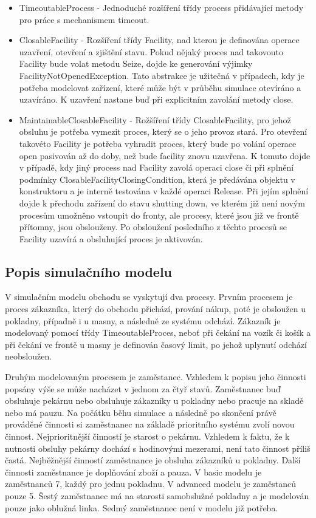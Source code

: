 \documentclass[12pt,a4paper,titlepage]{article}
\begin{document}
\begin{itemize}
\item TimeoutableProcess  - Jednoduché rozšíření třídy process přidávající metody pro práce s mechanismem timeout.
\item ClosableFacility -  Rozšíření třídy Facility, nad kterou je definována operace uzavření, otevření a zjištění stavu. Pokud nějaký proces nad takovouto Facility bude volat metodu Seize, dojde ke generování výjimky FacilityNotOpenedException. Tato abstrakce je užitečná v případech, kdy je potřeba modelovat zařízení, které může být v průběhu simulace otevíráno a uzavíráno. K uzavření nastane buď při explicitním zavolání metody close. 
\item MaintainableClosableFacility - Rožšíření třídy ClosableFacility, pro jehož obsluhu je potřeba vymezit proces, který se o jeho provoz stará. Pro otevření takovéto Facility je potřeba vyhradit proces, který bude po volání operace open pasivován až do doby, než bude facility znovu uzavřena. K tomuto dojde v případě, kdy jiný process nad Facility zavolá operaci close či při splnění podmínky ClosableFacilityClosingCondition, která je předávána objektu v konstruktoru a je interně testována v každé operaci Release. Při jejím splnění dojde k přechodu zařízení do stavu shutting down, ve kterém již není novým procesům umožněno vstoupit do fronty, ale procesy, které jsou již ve frontě přítomny, jsou obslouženy. Po obsloužení posledního z těchto procesů se Facility uzavírá a obsluhující proces je aktivován. 
\end{itemize}

\subsection{Popis simulačního modelu}
V simulačním modelu obchodu se vyskytují dva procesy. Prvním procesem je proces zákazníka, který do obchodu přichází, prování nákup, poté je obsloužen u pokladny, případně i u masny, a následně ze systému odchází. Zákazník je modelovaný pomocí třídy TimeoutableProces, neboť při čekání na vozík či košík a při čekání ve frontě u masny je definován časový limit, po jehož uplynutí odchází neobsloužen.

Druhým modelovaným procesem je zaměstanec. Vzhledem k popisu jeho činnosti popsány výše se může nacházet v jednom za čtyř stavů. Zaměstnanec buď obsluhuje pekárnu nebo obsluhuje zákazníky u pokladny nebo pracuje na skladě nebo má pauzu. Na počátku běhu simulace a následně po skončení právě prováděné činnosti si zaměstnanec na základě prioritního systému zvolí novou činnost. Nejprioritnější činností je starost o pekárnu. Vzhledem k faktu, že k nutnosti obsluhy pekárny dochází s hodinovými mezerami, není tato činnost příliš častá. Nejběžnější činností zaměstnance je obsluha zákazníků u pokladny. Další činnosti zaměstnance je doplňování zboží a pauza. V basic modelu je zaměstnanců 7, každý pro jednu pokladnu. V advanced modelu je zaměstanců pouze 5. Šestý zaměstnanec má na starosti samobslužné pokladny a je modelován pouze jako oblužná linka. Sedmý zaměstnanec není v modelu již potřeba. 
\end{document}
